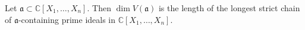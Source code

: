 Let $\mathfrak{a} \subset \mathbb{C}[X_1, \ldots, X_n]$. Then $\dim V(\mathfrak{a})$ is the length of the longest strict chain of $\mathfrak{a}$-containing prime ideals in $\mathbb{C}[X_1, \ldots, X_n]$.
